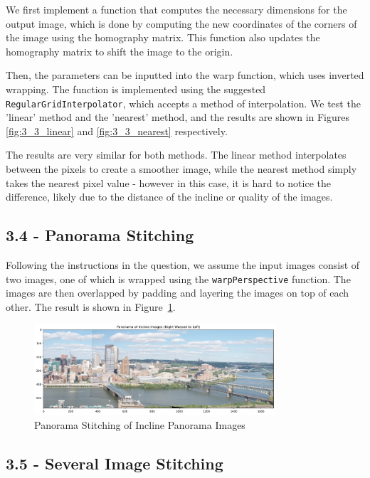 \documentclass{article}
\begin{document}
We first implement a function that computes the necessary dimensions for the output image, which is done by computing the new coordinates of the corners of the image using the homography matrix. This function also updates the homography matrix to shift the image to the origin.

Then, the parameters can be inputted into the warp function, which uses inverted wrapping. The function is implemented using the suggested \texttt{RegularGridInterpolator}, which accepts a method of interpolation. We test the 'linear' method and the 'nearest' method, and the results are shown in Figures \ref{fig:3_3_linear} and \ref{fig:3_3_nearest} respectively.

The results are very similar for both methods. The linear method interpolates between the pixels to create a smoother image, while the nearest method simply takes the nearest pixel value - however in this case, it is hard to notice the difference, likely due to the distance of the incline or quality of the images.


\subsection*{3.4 - Panorama Stitching}

Following the instructions in the question, we assume the input images consist of two images, one of which is wrapped using the \texttt{warpPerspective} function. The images are then overlapped by padding and layering the images on top of each other. The result is shown in Figure~\ref{fig:3_4}.

\begin{figure}[h!]
    \centering
    \includegraphics[width=0.8\textwidth]{../output/3.4_panorama.png}
    \caption{Panorama Stitching of Incline Panorama Images}
    \label{fig:3_4}
\end{figure}

\subsection*{3.5 - Several Image Stitching}
\end{document}
